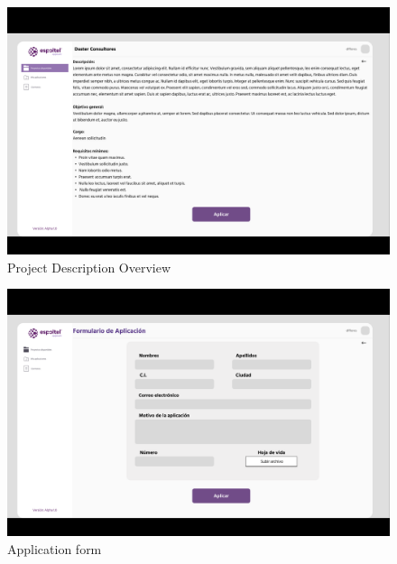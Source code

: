 \documentclass{scrreprt}
\begin{document}
\begin{figure}[H]
    
    \centering \small
    \includegraphics[width=1\textwidth]{WebPrototype/Projectsflow3.png}
    \caption{Project Description Overview}
\end{figure} 

\begin{figure}[H]
    
    \centering \small
    \includegraphics[width=1\textwidth]{WebPrototype/Projectsflow4.png}
    \caption{Application form}
\end{figure} 
\end{document}
